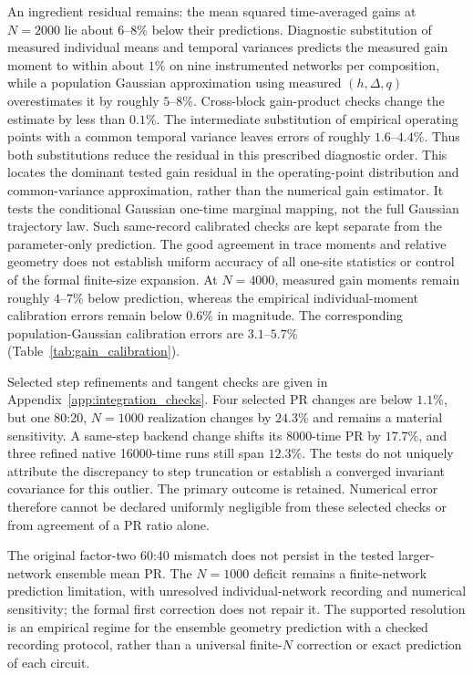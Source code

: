 An ingredient residual remains: the mean squared time-averaged gains at
$N=2000$ lie about $6$--$8\%$ below their predictions. Diagnostic
substitution of measured individual means and temporal variances predicts
the measured gain moment to within about $1\%$ on nine instrumented
networks per composition, while a population Gaussian approximation using
measured $(h,\Delta,q)$ overestimates it by roughly $5$--$8\%$.
Cross-block gain-product checks change the estimate by less than $0.1\%$.
The intermediate substitution of empirical operating points with a common
temporal variance leaves errors of roughly $1.6$--$4.4\%$. Thus both
substitutions reduce the residual in this prescribed diagnostic order.
This locates the dominant tested gain residual in the operating-point
distribution and common-variance approximation, rather than the numerical
gain estimator. It tests the conditional Gaussian one-time marginal mapping,
not the full Gaussian trajectory law. Such same-record calibrated checks are
kept separate from the parameter-only prediction. The good agreement in trace moments and relative
geometry does not establish uniform accuracy of all one-site statistics or
control of the formal finite-size expansion.
At $N=4000$, measured gain moments remain roughly $4$--$7\%$ below
prediction, whereas the empirical individual-moment
calibration errors remain below $0.6\%$ in magnitude. The corresponding
population-Gaussian calibration errors are $3.1$--$5.7\%$
(Table~\ref{tab:gain_calibration}).

Selected step refinements and tangent checks are given in
Appendix~\ref{app:integration_checks}. Four selected PR changes are below
$1.1\%$, but one 80:20, $N=1000$ realization changes by $24.3\%$ and
remains a material sensitivity. A same-step backend change shifts its
8000-time PR by $17.7\%$, and three refined native 16000-time runs still
span $12.3\%$. The tests do not uniquely attribute the discrepancy to
step truncation or establish a converged invariant covariance for this
outlier. The primary outcome is retained. Numerical error therefore cannot be declared uniformly
negligible from these selected checks or from agreement of a PR ratio alone.

The original factor-two 60:40 mismatch does not persist in the tested
larger-network ensemble mean PR. The $N=1000$ deficit remains a
finite-network prediction limitation, with unresolved individual-network
recording and numerical sensitivity; the formal first correction does not
repair it. The
supported resolution is an empirical regime for the ensemble geometry
prediction with a checked recording protocol, rather than a universal
finite-$N$ correction or exact prediction of each circuit.


